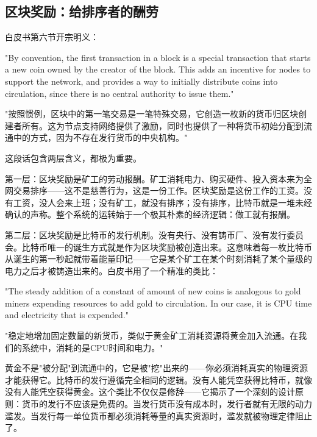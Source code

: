\documentclass[a4paper,12pt,openany]{ctexbook}
\newenvironment{quoting}{%
  \par\vspace{0.5em}%
  \begin{list}{}{%
    \setlength{\leftmargin}{2em}%
    \setlength{\rightmargin}{2em}%
    \setlength{\parsep}{0.3em}%
    \setlength{\itemsep}{0pt}%
    \setlength{\topsep}{0pt}%
  }%
  \item\relax
}{%
  \end{list}%
  \par\vspace{0.5em}%
}
\begin{document}
\subsection*{区块奖励：给排序者的酬劳}


白皮书第六节开宗明义：


\begin{quoting}
\small
"By convention, the first transaction in a block is a special transaction that starts a new coin owned by the creator of the block. This adds an incentive for nodes to support the network, and provides a way to initially distribute coins into circulation, since there is no central authority to issue them."

"按照惯例，区块中的第一笔交易是一笔特殊交易，它创造一枚新的货币归区块创建者所有。这为节点支持网络提供了激励，同时也提供了一种将货币初始分配到流通中的方式，因为不存在发行货币的中央机构。"
\end{quoting}


这段话包含两层含义，都极为重要。

第一层：区块奖励是矿工的劳动报酬。矿工消耗电力、购买硬件、投入资本来为全网交易排序——这不是慈善行为，这是一份工作。区块奖励是这份工作的工资。没有工资，没人会来上班；没有矿工，就没有排序；没有排序，比特币就是一堆未经确认的声称。整个系统的运转始于一个极其朴素的经济逻辑：做工就有报酬。

第二层：区块奖励是比特币的发行机制。没有央行、没有铸币厂、没有发行委员会。比特币唯一的诞生方式就是作为区块奖励被创造出来。这意味着每一枚比特币从诞生的第一秒起就带着能量印记——它是某个矿工在某个时刻消耗了某个量级的电力之后才被铸造出来的。白皮书用了一个精准的类比：


\begin{quoting}
\small
"The steady addition of a constant of amount of new coins is analogous to gold miners expending resources to add gold to circulation. In our case, it is CPU time and electricity that is expended."

"稳定地增加固定数量的新货币，类似于黄金矿工消耗资源将黄金加入流通。在我们的系统中，消耗的是CPU时间和电力。"
\end{quoting}


黄金不是"被分配"到流通中的，它是被"挖"出来的——你必须消耗真实的物理资源才能获得它。比特币的发行遵循完全相同的逻辑。没有人能凭空获得比特币，就像没有人能凭空获得黄金。这个类比不仅仅是修辞——它揭示了一个深刻的设计原则：货币的发行不应该是免费的。当发行货币没有成本时，发行者就有无限的动力滥发。当发行每一单位货币都必须消耗等量的真实资源时，滥发就被物理定律阻止了。
\end{document}
